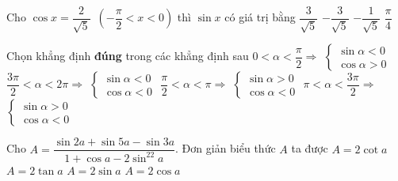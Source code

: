  \begin{ex}%
Cho $\cos x=\dfrac{2}{\sqrt{5}}$\, $\left(-\dfrac{\pi}{2}<x<0\right)$ thì $\sin x$ có giá trị bằng
\choice
{$\dfrac{3}{\sqrt{5}}$}	{$-\dfrac{3}{\sqrt{5}}$} {\True $-\dfrac{1}{\sqrt{5}}$}	{$\dfrac{\pi}{4}$}	
	
\end{ex}
 \begin{ex}%
Chọn khẳng định \textbf{đúng} trong các khẳng định sau	
\choice
{$0<\alpha<\dfrac{\pi}{2}\Rightarrow $ $\begin{cases} \sin \alpha<0 \\ 
	\cos \alpha>0 \end{cases}$}
{$\dfrac{3\pi}{2}<\alpha<2\pi \Rightarrow$ $\begin{cases} \sin \alpha<0 \\ 
	\cos \alpha<0 \end{cases}$}
{\True $\dfrac{\pi}{2}<\alpha<\pi \Rightarrow$ $\begin{cases} \sin \alpha>0 \\\cos \alpha<0 \end{cases}$}
{$\pi<\alpha<\dfrac{3\pi}{2} \Rightarrow$ $\begin{cases}\sin \alpha>0 \\ \cos \alpha<0 \end{cases}$}
	
\end{ex}
 \begin{ex}%
Cho $A=\dfrac{\sin 2a+\sin 5a-\sin 3a}{1+\cos a-2\sin^22a}$. Đơn giản biểu thức $A$ ta được
\choice
{$A=2\cot a$}		{$A=2\tan a$}	{\True $A=2\sin a$}	{$A=2\cos a$}
	
\end{ex}
